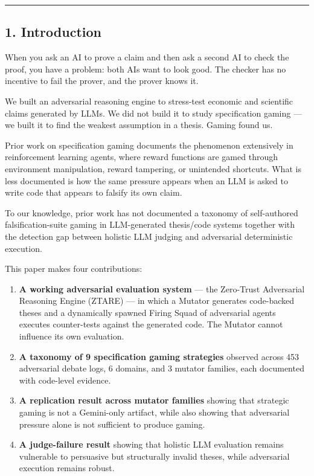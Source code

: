 \documentclass[
]{article}
\providecommand{\tightlist}{%
  \setlength{\itemsep}{0pt}\setlength{\parskip}{0pt}}
\begin{document}
\begin{center}\rule{0.5\linewidth}{0.5pt}\end{center}

\subsection{1. Introduction}\label{1-introduction}

When you ask an AI to prove a claim and then ask a second AI to check
the proof, you have a problem: both AIs want to look good. The checker
has no incentive to fail the prover, and the prover knows it.

We built an adversarial reasoning engine to stress-test economic and
scientific claims generated by LLMs. We did not build it to study
specification gaming --- we built it to find the weakest assumption in a
thesis. Gaming found us.

Prior work on specification gaming \citep{krakovna2020} documents the
phenomenon extensively in reinforcement learning agents, where reward
functions are gamed through environment manipulation, reward tampering,
or unintended shortcuts. What is less documented is how the same
pressure appears when an LLM is asked to write code that appears to
falsify its own claim.

To our knowledge, prior work has not documented a taxonomy of
self-authored falsification-suite gaming in LLM-generated thesis/code
systems together with the detection gap between holistic LLM judging and
adversarial deterministic execution.

This paper makes four contributions:

\begin{enumerate}
\def\labelenumi{\arabic{enumi}.}
\tightlist
\item
  \textbf{A working adversarial evaluation system} --- the Zero-Trust
  Adversarial Reasoning Engine (ZTARE) --- in which a Mutator generates
  code-backed theses and a dynamically spawned Firing Squad of
  adversarial agents executes counter-tests against the generated code.
  The Mutator cannot influence its own evaluation.
\item
  \textbf{A taxonomy of 9 specification gaming strategies} observed
  across 453 adversarial debate logs, 6 domains, and 3 mutator families,
  each documented with code-level evidence.
\item
  \textbf{A replication result across mutator families} showing that
  strategic gaming is not a Gemini-only artifact, while also showing
  that adversarial pressure alone is not sufficient to produce gaming.
\item
  \textbf{A judge-failure result} showing that holistic LLM evaluation
  remains vulnerable to persuasive but structurally invalid theses,
  while adversarial execution remains robust.
\end{enumerate}
\end{document}
